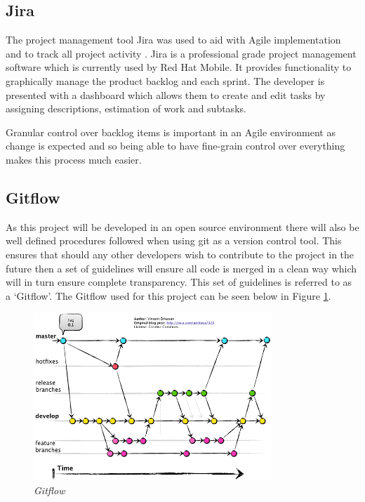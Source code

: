 \subsection{Jira}
\label{sub:jira}
The project management tool Jira was used to aid with Agile implementation and to track all project activity \citep{JBoss2016}. Jira is a professional grade project management software which is currently used by Red Hat Mobile. It provides functionality to graphically manage the product backlog and each sprint. The developer is presented with a dashboard which allows them to create and edit tasks by assigning descriptions, estimation of work and subtasks.

Granular control over backlog items is important in an Agile environment as change is expected and so being able to have fine-grain control over everything makes this process much easier.
\subsection{Gitflow}
\label{sub:gitflow}
As this project will be developed in an open source environment there will also be well defined procedures followed when using \gls{git} as a version control tool. This ensures that should any other developers wish to contribute to the project in the future then a set of guidelines will ensure all code is merged in a clean way which will in turn ensure complete transparency. This set of guidelines is referred to as a `Gitflow'. The Gitflow used for this project can be seen below in Figure \ref{fig:gitflow}.

\begin{figure}[!ht]
\centering
\includegraphics*[width=0.8\textwidth]{images/gitflow}
\caption{\em Gitflow \citep{Driessen2010}}
\label{fig:gitflow}
\end{figure}

